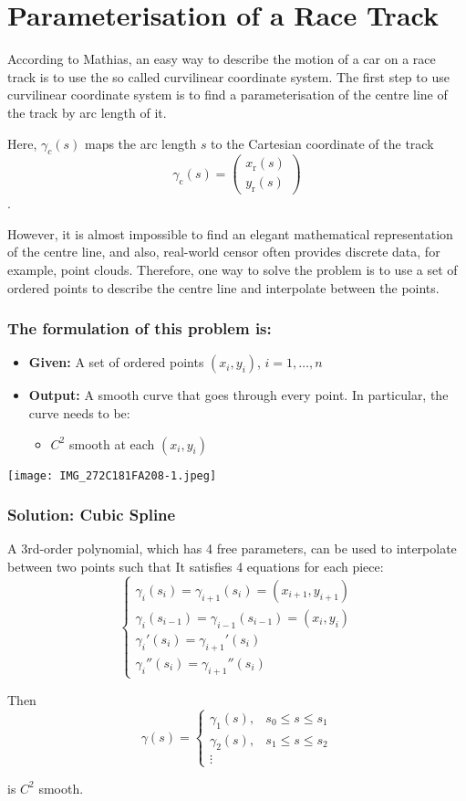 \documentclass{article}
\begin{document}
\section*{Parameterisation of a Race Track}
According to Mathias, an easy way to describe the motion of a car on a race track is to use the so called curvilinear coordinate system. The first step to use curvilinear coordinate system is to find a parameterisation of the centre line of the track by arc length of it.

Here, $\gamma_{c}(s)$ maps the arc length $s$ to the Cartesian coordinate of the track
\[
\gamma_{\text{c}}(s) = 
\begin{pmatrix}
x_{\text{r}}(s) \\
y_{\text{r}}(s)
\end{pmatrix}
\].

However, it is almost impossible to find an elegant mathematical representation of the centre line, and also, real-world censor often provides discrete data, for example, point clouds. Therefore, one way to solve the problem is to use a set of ordered points to describe the centre line and interpolate between the points.
\subsubsection*{The formulation of this problem is:}

\begin{itemize}
    \item \textbf{Given:} A set of ordered points $(x_i, y_i)$, $i = 1, \dots, n$
    \item \textbf{Output:} A smooth curve that goes through every point. In particular, the curve needs to be:
    \begin{itemize}
        \item $C^2$ smooth at each $(x_i, y_i)$
    \end{itemize}
\end{itemize}

\begin{center}
\texttt{[image: IMG\_272C181FA208-1.jpeg]} %
\end{center}

\subsubsection*{Solution: Cubic Spline}

A 3rd-order polynomial, which has 4 free parameters, can be used to interpolate between two points such that It satisfies 4 equations for each piece:
\[
\begin{cases}
\gamma_{i}(s_i) = \gamma_{i+1}(s_{i}) = (x_{i+1}, y_{i+1}) \\
\gamma_{i}(s_{i-1}) = \gamma_{i-1}(s_{i-1}) = (x_{i}, y_{i}) \\
\gamma_{i}'(s_i) = \gamma_{i+1}'(s_i) \\
\gamma_{i}''(s_i) = \gamma_{i+1}''(s_i)
\end{cases}
\]

Then
\[
\gamma(s)=
\begin{cases}
\gamma_1(s), & s_0 \leq s \leq s_1 \\
\gamma_2(s), & s_1 \leq s \leq s_2 \\
\vdots
\end{cases}
\]
\bigskip

is $C^2$ smooth.
\end{document}
